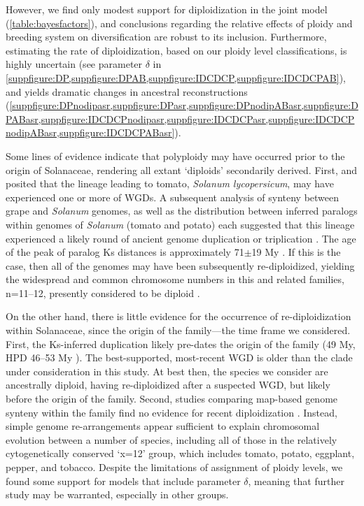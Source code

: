 However, we find only modest support for diploidization in the joint model  (\cref{table:bayesfactors}), and conclusions regarding the relative effects of ploidy and breeding system on diversification are robust to its inclusion.
Furthermore, estimating the rate of diploidization, based on our ploidy level classifications, is highly uncertain (see parameter $\delta$ in \cref{suppfigure:DP,suppfigure:DPAB,suppfigure:IDCDCP,suppfigure:IDCDCPAB}), and yields dramatic changes in ancestral reconstructions (\cref{suppfigure:DPnodipasr,suppfigure:DPasr,suppfigure:DPnodipABasr,suppfigure:DPABasr,suppfigure:IDCDCPnodipasr,suppfigure:IDCDCPasr,suppfigure:IDCDCPnodipABasr,suppfigure:IDCDCPABasr}).


Some lines of evidence indicate that polyploidy may have occurred prior to the origin of Solanaceae, rendering all extant `diploids' secondarily derived. %
First, \citet{ku2000} and \citet{blanc2004} posited that the lineage leading to tomato, \textit{Solanum lycopersicum}, may have experienced one or more of WGDs.
A subsequent analysis of synteny between grape and \textit{Solanum} genomes, as well as the distribution between inferred paralogs within genomes of \textit{Solanum} (tomato and potato) each suggested that this lineage experienced a likely round of ancient genome duplication or triplication \citep{tomato2012}. 
The age of the peak of paralog Ks distances is approximately 71$\pm$19 My \citep{tomato2012}. 
If this is the case, then all of the genomes may have been subsequently re-diploidized, yielding the widespread and common chromosome numbers in this and related families, n=11--12, presently considered to be diploid \citep{robertson_2011}. 

On the other hand, there is little evidence for the occurrence of re-diploidization within Solanaceae, since the origin of the family---the time frame we considered.
First, the Ks-inferred duplication likely pre-dates the origin of the family (49 My, HPD 46--53 My \citealt{sarkinen_2013}). 
The best-supported, most-recent WGD \citep{tomato2012} is older than the clade under consideration in this study.
At best then, the species we consider are ancestrally diploid, having re-diploidized after a suspected WGD, but likely before the origin of the family.
Second, studies comparing map-based genome synteny within the family find no evidence for recent diploidization \citep{wu_2010a}.
Instead, simple genome re-arrangements appear sufficient to explain chromosomal evolution between a number of species, including all of those in the relatively cytogenetically conserved `x=12' group, which includes tomato, potato, eggplant, pepper, and tobacco.
Despite the limitations of assignment of ploidy levels, we found some support for models that include parameter $\delta$, meaning that further study may be warranted, especially in other groups.

